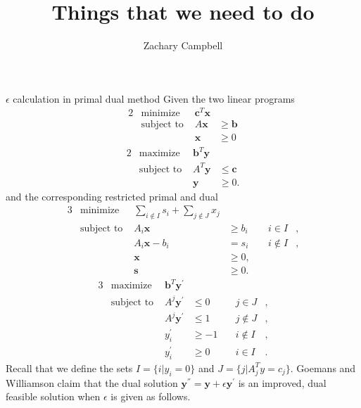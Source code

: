 \documentclass[11pt]{article}
\renewcommand{\'}{^{'}}
\begin{document}
\title{Things that we need to do}
\author{Zachary Campbell}

\maketitle

\begin{section}{$\epsilon$ calculation in primal dual method}
	Given the two linear programs 
	\begin{alignat}{2}
		& \text{minimize} & \mathbf{c}^{T}\mathbf{x} \\
		& \text{subject to } & A\mathbf{x} & \geq \mathbf{b} \\
		&& \mathbf{x} & \geq 0
	\end{alignat}
	\begin{alignat}{2}
		& \text{maximize} & \mathbf{b}^{T}\mathbf{y} \\
		& \text{subject to } & A^{T}\mathbf{y} & \leq \mathbf{c} \\
		&& \mathbf{y} & \geq 0.
	\end{alignat}
	and the corresponding restricted primal and dual
	\begin{alignat}{3}
		& \text{minimize } & \sum_{i\notin I} s_i + \sum_{j\notin J} x_j & \\
		& \text{subject to } & A_i\mathbf{x} & \geq b_i & \quad i\in I &, \\
				     && A_i\mathbf{x} - b_i & = s_i & \quad i\notin I &, \\
				     && \mathbf{x} & \geq 0, \\
				     && \mathbf{s} & \geq 0.
	\end{alignat}
	\begin{alignat}{3}
		& \text{maximize } & \mathbf{b}^{T}\mathbf{y}\' & \\
		& \text{subject to } & A^{j}\mathbf{y}\' & \leq 0 & \quad j\in J &, \\
				     && A^{j}\mathbf{y}\' & \leq 1 & \quad j\notin J &, \\
				     && y_i\' & \geq -1 & \quad i\notin I &, \\
				     && y_i\' & \geq 0 & \quad i\in I &.
	\end{alignat}
	Recall that we define the sets $I = \{i | y_i = 0\}$ and $J = \{j | A^{T}_j y = c_j\}$.
	Goemans and Williamson claim that the dual solution $\mathbf{y}^{''} = \mathbf{y} + \epsilon 
	\mathbf{y}^{'}$ is an improved, dual feasible solution when $\epsilon$ is given as follows. 
	\begin{itemize}

\end{itemize}
\end{section}
\end{document}
